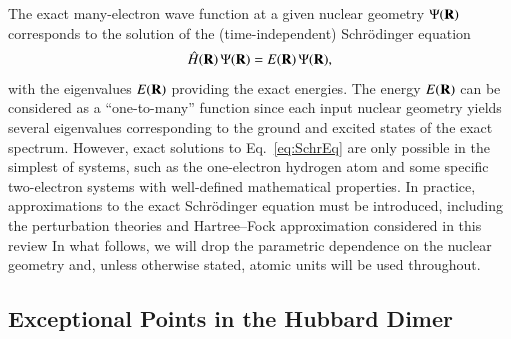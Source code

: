 \documentclass[aps,prb,reprint,noshowkeys,superscriptaddress]{revtex4-1}
\newcommand{\hH}{\Hat{H}}
\begin{document}
The exact many-electron wave function at a given nuclear geometry $\Psi(\vb{R})$ corresponds 
to the solution of the (time-independent) Schr\"{o}dinger equation
\begin{equation} 
    \hH(\vb{R})\, \Psi(\vb{R}) = E(\vb{R})\, \Psi(\vb{R}),
    \label{eq:SchrEq}
\end{equation} 
with the eigenvalues $E(\vb{R})$ providing the exact energies.
The energy $E(\vb{R})$ can be considered as a ``one-to-many'' function since each input nuclear geometry
yields several eigenvalues corresponding to the ground and excited states of the exact spectrum.
However, exact solutions to Eq.~\eqref{eq:SchrEq} are only possible in the simplest of systems, such as 
the one-electron hydrogen atom and some specific two-electron systems with well-defined mathematical 
properties.\cite{Taut_1993,Loos_2009b,Loos_2010e,Loos_2012}
In practice, approximations to the exact Schr\"{o}dinger equation must be introduced, including
the perturbation theories and Hartree--Fock approximation considered in this review
In what follows, we will drop the parametric dependence on the nuclear geometry and, 
unless otherwise stated, atomic units will be used throughout.

\subsection{Exceptional Points in the Hubbard Dimer}
\label{sec:example}
\end{document}
